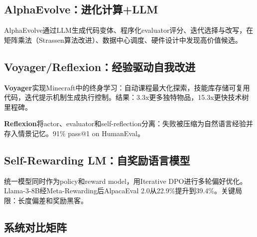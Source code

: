 \subsection{AlphaEvolve：进化计算+LLM}

AlphaEvolve通过LLM生成代码变体、程序化evaluator评分、迭代选择与改写，在矩阵乘法（Strassen算法改进）、数据中心调度、硬件设计中发现高价值候选。

\subsection{Voyager/Reflexion：经验驱动自我改进}

\textbf{Voyager}实现Minecraft中的终身学习：自动课程最大化探索，技能库存储可复用代码，迭代提示机制生成执行控制。结果：3.3x更多独特物品，15.3x更快技术树里程碑。

\textbf{Reflexion}将actor、evaluator和self-reflection分离：失败被压缩为自然语言经验并存入情景记忆。91\% pass@1 on HumanEval。

\subsection{Self-Rewarding LM：自奖励语言模型}

统一模型同时作为policy和reward model，用Iterative DPO进行多轮偏好优化。Llama-3-8B经Meta-Rewarding后AlpacaEval 2.0从22.9\%提升到39.4\%。关键局限：长度偏差和奖励黑客。

\subsection{系统对比矩阵}\label{sec:system-compare}

